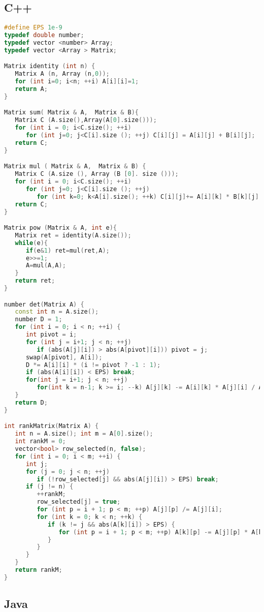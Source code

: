 \subsection{C++}
\begin{lstlisting}[language=C++]
#define EPS 1e-9
typedef double number;
typedef vector <number> Array;
typedef vector <Array > Matrix;

Matrix identity (int n) {
   Matrix A (n, Array (n,0));
   for (int i=0; i<n; ++i) A[i][i]=1;
   return A;
}

Matrix sum( Matrix & A,  Matrix & B){
   Matrix C (A.size(),Array(A[0].size()));
   for (int i = 0; i<C.size(); ++i)
      for (int j=0; j<C[i].size (); ++j) C[i][j] = A[i][j] + B[i][j];
   return C;
}

Matrix mul ( Matrix & A,  Matrix & B) {
   Matrix C (A.size (), Array (B [0]. size ()));
   for (int i = 0; i<C.size(); ++i)
      for (int j=0; j<C[i].size (); ++j)
         for (int k=0; k<A[i].size(); ++k) C[i][j]+= A[i][k] * B[k][j];
   return C;
}

Matrix pow (Matrix & A, int e){
   Matrix ret = identity(A.size());
   while(e){
      if(e&1) ret=mul(ret,A);
      e>>=1;
      A=mul(A,A);
   }
   return ret;
}

number det(Matrix A) {
   const int n = A.size();
   number D = 1;
   for (int i = 0; i < n; ++i) {
      int pivot = i;
      for (int j = i+1; j < n; ++j)
         if (abs(A[j][i]) > abs(A[pivot][i])) pivot = j;
      swap(A[pivot], A[i]);
      D *= A[i][i] * (i != pivot ? -1 : 1);
      if (abs(A[i][i]) < EPS) break;
      for(int j = i+1; j < n; ++j)
         for(int k = n-1; k >= i; --k) A[j][k] -= A[i][k] * A[j][i] / A[i][i];
   }
   return D;
}

int rankMatrix(Matrix A) {
   int n = A.size(); int m = A[0].size();
   int rankM = 0;
   vector<bool> row_selected(n, false);
   for (int i = 0; i < m; ++i) {
      int j;
      for (j = 0; j < n; ++j) 
         if (!row_selected[j] && abs(A[j][i]) > EPS) break;
	  if (j != n) {
         ++rankM;
         row_selected[j] = true;
         for (int p = i + 1; p < m; ++p) A[j][p] /= A[j][i];
         for (int k = 0; k < n; ++k) {
            if (k != j && abs(A[k][i]) > EPS) {
               for (int p = i + 1; p < m; ++p) A[k][p] -= A[j][p] * A[k][i];
            }
         }
      }
   }
   return rankM;
}

\end{lstlisting}

\subsection{Java}

